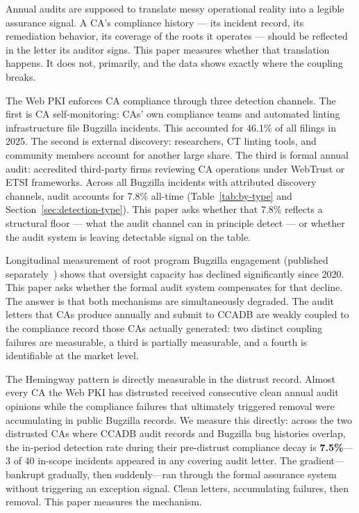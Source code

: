 \documentclass[10pt,twocolumn,letterpaper]{article}
\begin{document}
Annual audits are supposed to translate messy operational reality into a
legible assurance signal. A CA's compliance history --- its incident record,
its remediation behavior, its coverage of the roots it operates --- should
be reflected in the letter its auditor signs. This paper measures whether
that translation happens. It does not, primarily, and the data shows
exactly where the coupling breaks.

The Web PKI enforces CA compliance through three detection channels.
The first is CA self-monitoring: CAs' own compliance teams and automated
linting infrastructure file Bugzilla incidents. This accounted for 46.1\%
of all filings in 2025. The second is external discovery: researchers,
CT linting tools, and community members account for another large share.
The third is formal annual audit: accredited third-party firms reviewing
CA operations under WebTrust or ETSI frameworks. Across all Bugzilla
incidents with attributed discovery channels, audit accounts for
7.8\% all-time (Table~\ref{tab:by-type} and Section~\ref{sec:detection-type}). This paper asks whether that 7.8\%
reflects a structural floor --- what the audit channel can in principle
detect --- or whether the audit system is leaving detectable signal
on the table.

Longitudinal measurement of root program Bugzilla engagement (published
separately~\cite{sister}) shows that oversight capacity has declined
significantly since 2020. This paper asks whether the
formal audit system compensates for that decline. The answer is
that both mechanisms are simultaneously degraded. The audit letters
that CAs produce annually and submit to CCADB are weakly coupled to
the compliance record those CAs actually generated: two distinct
coupling failures are measurable, a third is partially measurable,
and a fourth is identifiable at the market level.

The Hemingway pattern is directly measurable in the distrust record.
Almost every CA the Web PKI has distrusted received consecutive clean
annual audit opinions while the compliance failures that ultimately
triggered removal were accumulating in public Bugzilla records. We
measure this directly: across the two distrusted CAs where CCADB
audit records and Bugzilla bug histories overlap, the in-period
detection rate during their pre-distrust compliance decay is
\textbf{7.5\%}---3 of 40 in-scope incidents appeared in any
covering audit letter. The gradient---bankrupt gradually, then
suddenly---ran through the formal assurance system without triggering
an exception signal. Clean letters, accumulating failures, then
removal. This paper measures the mechanism.
\end{document}

